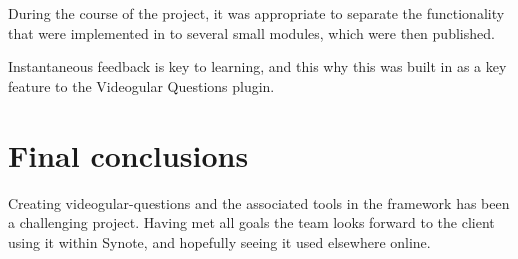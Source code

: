 During the course of the project, it was appropriate to separate the
functionality that were implemented in to several small modules, which were
then published.

Instantaneous feedback is key to learning, and this why this was built in as a
key feature to the Videogular Questions plugin.

\section{Final conclusions}

Creating videogular-questions and the associated tools in the framework has been a challenging project. Having met all goals the team looks forward to the client using it within Synote, and hopefully seeing it used elsewhere online. 
